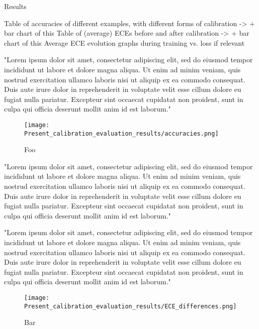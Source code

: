 Results

Table of accuracies of different examples, with different forms of calibration
  -> + bar chart of this
Table of (average) ECEs before and after calibration
  -> + bar chart of this
Average ECE evolution graphs during training vs. loss if relevant



"Lorem ipsum dolor sit amet, consectetur adipiscing elit, sed do eiusmod tempor incididunt ut labore et dolore magna aliqua. Ut enim ad minim veniam, quis nostrud exercitation ullamco laboris nisi ut aliquip ex ea commodo consequat. Duis aute irure dolor in reprehenderit in voluptate velit esse cillum dolore eu fugiat nulla pariatur. Excepteur sint occaecat cupidatat non proident, sunt in culpa qui officia deserunt mollit anim id est laborum."

\begin{figure}[htbp!]
  \centering
  \texttt{[image: Present\_calibration\_evaluation\_results/accuracies.png]}
  \caption[Foo]{Foo}
  \label{fig:accuracies}
\end{figure}
\newpage

"Lorem ipsum dolor sit amet, consectetur adipiscing elit, sed do eiusmod tempor incididunt ut labore et dolore magna aliqua. Ut enim ad minim veniam, quis nostrud exercitation ullamco laboris nisi ut aliquip ex ea commodo consequat. Duis aute irure dolor in reprehenderit in voluptate velit esse cillum dolore eu fugiat nulla pariatur. Excepteur sint occaecat cupidatat non proident, sunt in culpa qui officia deserunt mollit anim id est laborum."



"Lorem ipsum dolor sit amet, consectetur adipiscing elit, sed do eiusmod tempor incididunt ut labore et dolore magna aliqua. Ut enim ad minim veniam, quis nostrud exercitation ullamco laboris nisi ut aliquip ex ea commodo consequat. Duis aute irure dolor in reprehenderit in voluptate velit esse cillum dolore eu fugiat nulla pariatur. Excepteur sint occaecat cupidatat non proident, sunt in culpa qui officia deserunt mollit anim id est laborum."

\begin{figure}[htbp!]
  \centering
  \texttt{[image: Present\_calibration\_evaluation\_results/ECE\_differences.png]}
  \caption[Bar]{Bar}
  \label{fig:ECE_difference}
\end{figure}
\newpage

